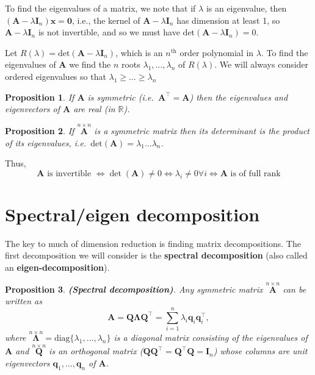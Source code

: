 \documentclass[]{book}
\newtheorem{proposition}{Proposition}[chapter]
\theoremstyle{definition}
\theoremstyle{definition}
\theoremstyle{definition}
\theoremstyle{remark}
\begin{document}
To find the eigenvalues of a matrix, we note that if \(\lambda\) is an eigenvalue, then \((\boldsymbol A-\lambda \mathbf I_n)\boldsymbol x=\boldsymbol 0\), i.e., the kernel of \(\boldsymbol A-\lambda \mathbf I_n\) has dimension at least 1, so \(\boldsymbol A-\lambda \mathbf I_n\) is not invertible, and so we must have \(\text{det}({\mathbf A}-\lambda {\mathbf I}_n)=0\).

Let \(R(\lambda )=\text{det}({\mathbf A}-\lambda {\mathbf I}_n)\), which is an \(n^{\text{th}}\) order polynomial in \(\lambda\). To find the eigenvalues of \(\boldsymbol A\) we find the \(n\) roots \(\lambda _1, \dots , \lambda _n\) of \(R(\lambda )\). We will always consider ordered eigenvalues so that \(\lambda _1\geq \dots \geq \lambda _n\)

\begin{proposition}
\protect\hypertarget{prp:unnamed-chunk-2}{}{\label{prp:unnamed-chunk-2} }If \(\mathbf A\) is symmetric (i.e.~\({\mathbf A}^\top ={\mathbf A}\)) then the
eigenvalues and eigenvectors of \(\mathbf A\) are \emph{real} (in \(\mathbb{R}\)).
\end{proposition}

\begin{proposition}
\protect\hypertarget{prp:deteig}{}{\label{prp:deteig} }If \(\stackrel{n\times n}{\mathbf A}\) is a symmetric matrix
then its determinant is the product of its eigenvalues, i.e.~\(\text{det}({\mathbf A})=\lambda _1 \dots \lambda _n\).
\end{proposition}

Thus,
\[\boldsymbol A\mbox{ is invertible } \iff  \det(\boldsymbol A)\not=0 \iff 
\lambda_i\not=0 \forall i \iff \boldsymbol A\mbox{ is of full rank}\]

\hypertarget{spectraleigen-decomposition}{%
\section{Spectral/eigen decomposition}\label{spectraleigen-decomposition}}

The key to much of dimension reduction is finding matrix decompositions. The first decomposition we will consider is the \textbf{spectral decomposition} (also called an \textbf{eigen-decomposition}).

\begin{proposition}
\protect\hypertarget{prp:spectraldecomp}{}{\label{prp:spectraldecomp} }\textbf{(Spectral decomposition)}. Any symmetric matrix \(\stackrel{n\times n}{\mathbf A}\) can
be written as
\[ {\mathbf A}={\mathbf Q} {\mathbf\Lambda} \boldsymbol Q^\top = \sum _{i=1}^{n} \lambda _i {\mathbf q}_i {\mathbf q}_i^\top ,\]
where \(\stackrel{n\times n}{\mathbf \Lambda}=\text{diag}\{ \lambda _1, \dots , \lambda _n \}\) is
a diagonal matrix consisting of the eigenvalues of \(\mathbf A\) and \(\stackrel{n\times n}{\mathbf Q}\) is
an orthogonal matrix (\(\boldsymbol Q\boldsymbol Q^\top=\boldsymbol Q^\top \boldsymbol Q=\mathbf I_n\)) whose columns are unit eigenvectors
\({\mathbf q}_1, \dots , {\mathbf q}_n\) of \(\mathbf A\).
\end{proposition}
\end{document}
